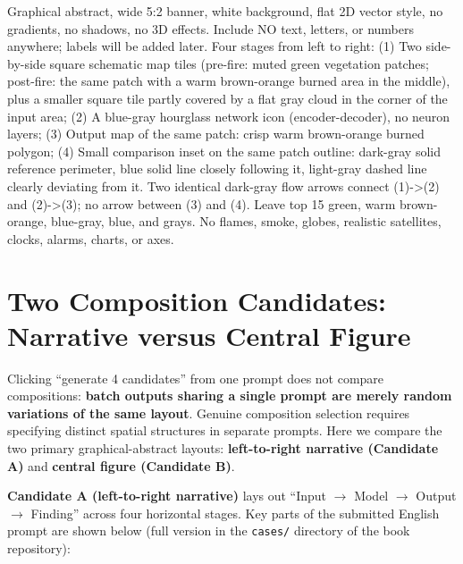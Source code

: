 \begin{Prompt}
Graphical abstract, wide 5:2 banner, white background, flat 2D vector style,
no gradients, no shadows, no 3D effects.
Include NO text, letters, or numbers anywhere; labels will be added later.
Four stages from left to right:
(1) Two side-by-side square schematic map tiles (pre-fire: muted green
    vegetation patches; post-fire: the same patch with a warm brown-orange
    burned area in the middle), plus a smaller square tile partly covered by a
    flat gray cloud in the corner of the input area;
(2) A blue-gray hourglass network icon (encoder-decoder), no neuron layers;
(3) Output map of the same patch: crisp warm brown-orange burned polygon;
(4) Small comparison inset on the same patch outline: dark-gray solid reference
    perimeter, blue solid line closely following it, light-gray dashed line
    clearly deviating from it.
Two identical dark-gray flow arrows connect (1)->(2) and (2)->(3); no arrow
between (3) and (4). Leave top 15%
green, warm brown-orange, blue-gray, blue, and grays. No flames, smoke, globes,
realistic satellites, clocks, alarms, charts, or axes.
\end{Prompt}

\section{Two Composition Candidates: Narrative versus Central Figure}

Clicking ``generate 4 candidates'' from one prompt does not compare compositions: \textbf{batch outputs sharing a single prompt are merely random variations of the same layout}. Genuine composition selection requires specifying distinct spatial structures in separate prompts. Here we compare the two primary graphical-abstract layouts: \textbf{left-to-right narrative (Candidate A)} and \textbf{central figure (Candidate B)}.

\textbf{Candidate A (left-to-right narrative)} lays out ``Input $\rightarrow$ Model $\rightarrow$ Output $\rightarrow$ Finding'' across four horizontal stages. Key parts of the submitted English prompt are shown below (full version in the \texttt{cases/} directory of the book repository):

